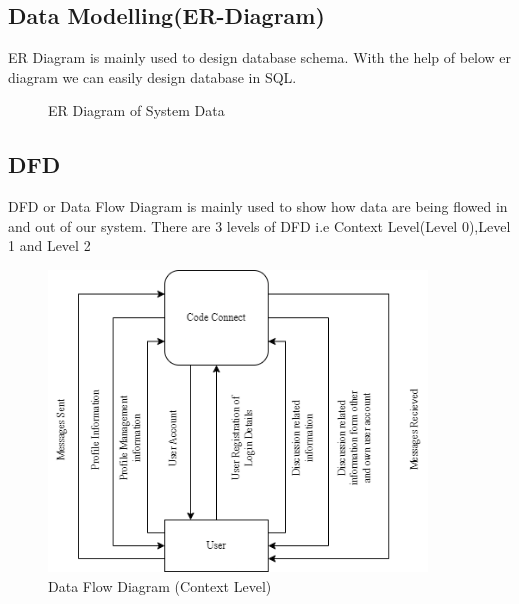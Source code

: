 \subsection{Data Modelling(ER-Diagram)}
ER Diagram is mainly used to design database schema. With the help of below er diagram we can easily design database in SQL.
\begin{figure}[H]
    \caption{ER Diagram of System Data}
\end{figure}
\newpage
\subsection{DFD}
DFD or Data Flow Diagram is mainly used to show how data are being flowed in and out of our system. There are 3 levels of DFD i.e Context Level(Level 0),Level 1 and Level 2
\begin{figure}[H]
    \centering
    \includegraphics[height = 8cm]{Diagrams/DFD.drawio.png}
    \caption{Data Flow Diagram (Context Level)}
\end{figure}
\newpage
